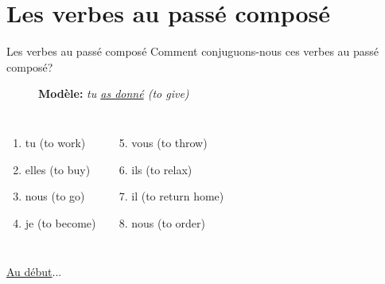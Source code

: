 \documentclass{beamer}
\begin{document}
  \section{Les verbes au passé composé}
    \begin{frame}{Les verbes au passé composé}
      Comment conjuguons-nous ces verbes au passé composé?
      \begin{description}
        \item[] \textbf{Modèle:} \emph{tu \underline{as donné} (to give)}
      \end{description}
      \begin{columns}[t]
          \begin{enumerate}
            \item tu \underline{} (to work)
            \item elles \underline{} (to buy)
            \item nous \underline{} (to go)
            \item je \underline{} (to become)
          \end{enumerate}
          \begin{enumerate}
            \setcounter{enumi}{4}
            \item vous \underline{} (to throw)
            \item ils \underline{} (to relax)
            \item il \underline{} (to return home)
            \item nous \underline{} (to order)
          \end{enumerate}
      \end{columns}
      \vspace{0.5cm}
      \hyperlink{début}{Au début}...
    \end{frame}
\end{document}
